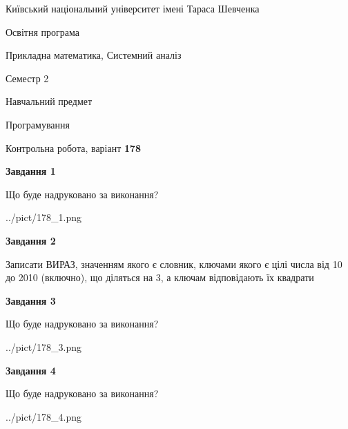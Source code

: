 \documentclass[12pt, ukrainian]{article}
\begin{document}
{{\begin {small}\par
{ \center  Київський національний університет імені Тараса Шевченка \par}
{\parbox {5 cm}{Освітня програма \hfill}{\parbox {8 cm}{Прикладна математика, Системний аналіз \hfill}}\parbox {5 cm}{\hfill Семестр 2}}\par
{\parbox {5 cm} {Навчальний предмет \hfill}\parbox {7 cm}{Програмування \hfill}\parbox {6cm}{\hfill}\par}\vspace{-7pt} \end{small}}{\center Контрольна робота, варіант  \No \textbf
{ 178 }\par}}
{
\begin {large}
{\begin {center}\textbf{Завдання 1}\end {center}}\par
Що буде надруковано за виконання?\par\par
\begin{center}
	{../pict/178_1.png}
\end{center}
\newpage

{\begin {center}\textbf{Завдання 2}\end {center}}\par
Записати ВИРАЗ, значенням якого є словник, ключами якого є цілі числа від 10 до 2010 (включно), що діляться на 3, а ключам відповідають їх квадрати\par
\newpage

{\begin {center}\textbf{Завдання 3}\end {center}}\par
Що буде надруковано за виконання?
\begin{center}
	{../pict/178_3.png}
\end{center}
\newpage

{\begin {center}\textbf{Завдання 4}\end {center}}\par
Що буде надруковано за виконання?\par
\begin{center}
	{../pict/178_4.png}
\end{center}
\newpage


\end{large}}
\end{document}
